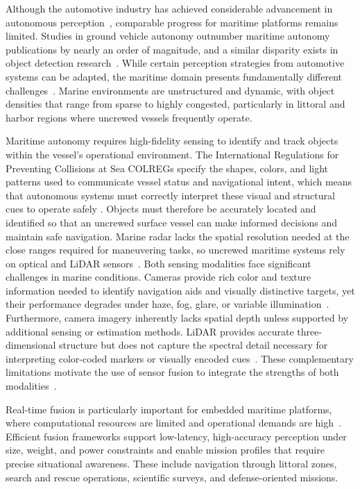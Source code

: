 \documentclass{erauthesis}
\begin{document}
Although the automotive industry has achieved considerable advancement in autonomous perception~\cite{cui2022}, comparable progress for maritime platforms remains limited. Studies in ground vehicle autonomy outnumber maritime autonomy publications by nearly an order of magnitude, and a similar disparity exists in object detection research~\cite{bae2023}. While certain perception strategies from automotive systems can be adapted, the maritime domain presents fundamentally different challenges~\cite{prasad2017}. Marine environments are unstructured and dynamic, with object densities that range from sparse to highly congested, particularly in littoral and harbor regions where uncrewed vessels frequently operate.

Maritime autonomy requires high-fidelity sensing to identify and track objects within the vessel’s operational environment. The International Regulations for Preventing Collisions at Sea \ac{COLREGs} specify the shapes, colors, and light patterns used to communicate vessel status and navigational intent, which means that autonomous systems must correctly interpret these visual and structural cues to operate safely \cite{COLREGs1972}. Objects must therefore be accurately located and identified so that an uncrewed surface vessel can make informed decisions and maintain safe navigation. Marine radar lacks the spatial resolution needed at the close ranges required for maneuvering tasks, so uncrewed maritime systems rely on optical and \ac{LiDAR} sensors~\cite{clunie2021}. Both sensing modalities face significant challenges in marine conditions. Cameras provide rich color and texture information needed to identify navigation aids and visually distinctive targets, yet their performance degrades under haze, fog, glare, or variable illumination~\cite{prasad2017}. Furthermore, camera imagery inherently lacks spatial
depth unless supported by additional sensing or estimation methods. \ac{LiDAR} provides accurate three-dimensional structure but does not capture the spectral detail necessary for interpreting color-coded markers or visually encoded cues~\cite{roriz2022}. These complementary limitations motivate the use of sensor fusion to integrate the strengths of both modalities~\cite{haghbayan2018}.

Real-time fusion is particularly important for embedded maritime platforms, where computational resources are limited and operational demands are high~\cite{thompson2023}. Efficient fusion frameworks support low-latency, high-accuracy perception under size, weight, and power constraints and enable mission profiles that require precise situational awareness. These include navigation through littoral zones, search and rescue operations, scientific surveys, and defense-oriented missions.
\end{document}
